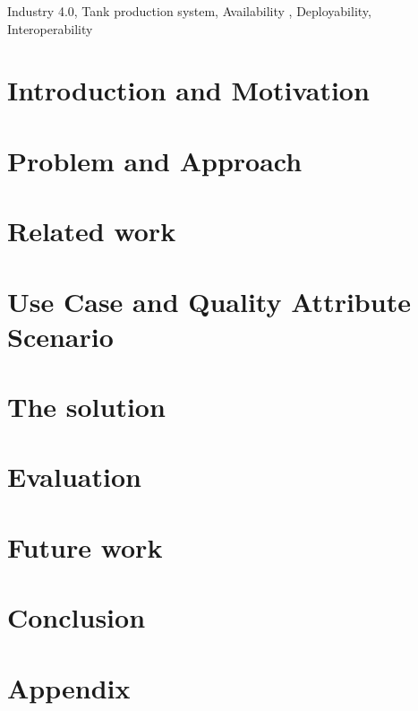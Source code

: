 \documentclass[conference]{IEEEtran}
\begin{document}
\pagestyle{empty}

\pagebreak
\begin{abstract}



\end{abstract}

\begin{IEEEkeywords}
Industry 4.0, Tank production system, Availability , Deployability, Interoperability 
\end{IEEEkeywords}

\section{Introduction and Motivation}



\section{Problem and Approach}
\label{sec:problem}


\section{Related work}
\label{sec:related_work}


\section{Use Case and Quality Attribute Scenario}
\label{sec:use_case_and_qas}


\section{The solution}
\label{sec:middleware_architecture}



\section{Evaluation}
\label{sec:evaluation}



\section{Future work}
\label{sec:futureWork}


\section{Conclusion}
\label{sec:conclusion}


\onecolumn 
\section{Appendix}
\label{sec:appendix}

\twocolumn 



\end{document}
